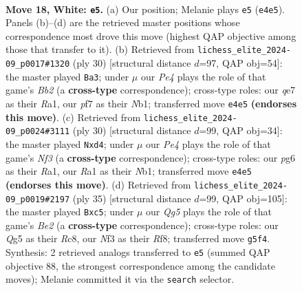 \documentclass[11pt]{article}
\begin{document}
\clearpage

\begin{figure}[p]\centering
\begin{subfigure}{0.46\textwidth}\centering
\resizebox{\linewidth}{!}{%
\newchessgame
\chessboard[
  setfen={2br4/1p2qpkp/r1nb1np1/p5Q1/P3P3/1P3NP1/1B3PBP/RN2R1K1 w - - 3 18},
  showmover=false,
  pgfstyle=straightmove, color=movearrow, markmove={e4-e5}
]}
\caption{}
\end{subfigure}\hfill
\begin{subfigure}{0.46\textwidth}\centering
\resizebox{\linewidth}{!}{%
\newchessgame
\chessboard[
  setfen={r1br2k1/pp2bppp/q1n1p3/4P3/2N3Q1/1P1n2P1/PB3PBP/RN1R2K1 w - - 5 16},
  showmover=false,
  pgfstyle=straightmove, color=movearrow, markmove={b2-a3}
]}
\caption{}
\end{subfigure}
\\[4pt]
\begin{subfigure}{0.46\textwidth}\centering
\resizebox{\linewidth}{!}{%
\newchessgame
\chessboard[
  setfen={r2q1rk1/5pbp/4bnp1/ppp5/3nP3/P4NPP/1B3PB1/RN1QR1K1 w - - 0 16},
  showmover=false,
  pgfstyle=straightmove, color=movearrow, markmove={f3-d4}
]}
\caption{}
\end{subfigure}\hfill
\begin{subfigure}{0.46\textwidth}\centering
\resizebox{\linewidth}{!}{%
\newchessgame
\chessboard[
  setfen={2r2rk1/4bppp/1q2pn2/pBNb4/Pp1N4/4PP2/1P2Q1PP/2RRB1K1 b - - 0 18},
  showmover=false,
  pgfstyle=straightmove, color=movearrow, markmove={e7-c5}
]}
\caption{}
\end{subfigure}
\caption{\textbf{Move 18, White: \texttt{e5}.} (a) Our position; Melanie plays \texttt{e5} (\texttt{e4e5}). Panels (b)--(d) are the retrieved master positions whose correspondence most drove this move (highest QAP objective among those that transfer to it). (b) Retrieved from \texttt{lichess\_elite\_2024-09\_p0017\#1320} (ply 30) [structural distance $d$=97, QAP obj=54]: the master played \texttt{Ba3}; under $\mu$ our \emph{Pe4} plays the role of that game's \emph{Bb2} (a \textbf{cross-type} correspondence); cross-type roles: our \emph{q}e7 as their \emph{R}a1, our \emph{p}f7 as their \emph{N}b1; transferred move \texttt{e4e5} \textbf{(endorses this move)}. (c) Retrieved from \texttt{lichess\_elite\_2024-09\_p0024\#3111} (ply 30) [structural distance $d$=99, QAP obj=34]: the master played \texttt{Nxd4}; under $\mu$ our \emph{Pe4} plays the role of that game's \emph{Nf3} (a \textbf{cross-type} correspondence); cross-type roles: our \emph{p}g6 as their \emph{R}a1, our \emph{R}a1 as their \emph{N}b1; transferred move \texttt{e4e5} \textbf{(endorses this move)}. (d) Retrieved from \texttt{lichess\_elite\_2024-09\_p0019\#2197} (ply 35) [structural distance $d$=99, QAP obj=105]: the master played \texttt{Bxc5}; under $\mu$ our \emph{Qg5} plays the role of that game's \emph{Be2} (a \textbf{cross-type} correspondence); cross-type roles: our \emph{Q}g5 as their \emph{R}c8, our \emph{N}f3 as their \emph{R}f8; transferred move \texttt{g5f4}. Synthesis: 2 retrieved analogs transferred to \texttt{e5} (summed QAP objective 88, the strongest correspondence among the candidate moves); Melanie committed it via the \texttt{search} selector.}

\end{figure}
\end{document}
